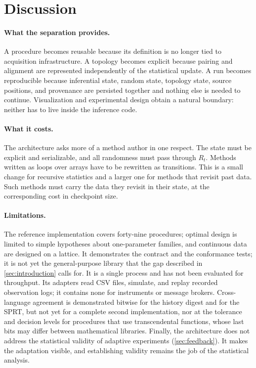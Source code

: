 \documentclass[11pt,a4paper]{article}
\theoremstyle{definition}
\theoremstyle{remark}
\begin{document}
\section{Discussion}
\label{sec:discussion}

\paragraph{What the separation provides.}
A procedure becomes reusable because its definition is no longer tied
to acquisition infrastructure. A topology becomes explicit because
pairing and alignment are represented independently of the statistical
update. A run becomes reproducible because inferential state, random
state, topology state, source positions, and provenance are persisted
together and nothing else is needed to continue. Visualization and
experimental design obtain a natural boundary: neither has to live
inside the inference code.

\paragraph{What it costs.}
The architecture asks more of a method author in one respect. The state
must be explicit and serializable, and all randomness must pass through
$R_t$. Methods written as loops over arrays have to be rewritten as
transitions. This is a small change for recursive statistics and a
larger one for methods that revisit past data. Such
methods must carry the data they revisit in their state, at the
corresponding cost in checkpoint size.

\paragraph{Limitations.}
The reference implementation covers forty-nine procedures; optimal
design is limited to simple hypotheses about one-parameter families, and
continuous data are designed on a lattice. It demonstrates the contract and the
conformance tests; it is not yet the general-purpose library that the
gap described in \cref{sec:introduction} calls for. It is a single
process and has not been evaluated for throughput. Its adapters read
CSV files, simulate, and replay recorded observation logs; it contains
none for instruments or message brokers. Cross-language agreement is
demonstrated bitwise for the history digest and for the SPRT, but not
yet for a complete second implementation, nor at the tolerance and
decision levels for procedures that use transcendental functions, whose
last bits may differ between mathematical libraries. Finally, the architecture
does not address the statistical validity of adaptive experiments
(\cref{sec:feedback}). It makes the adaptation visible, and establishing
validity remains the job of the statistical analysis.
\end{document}
